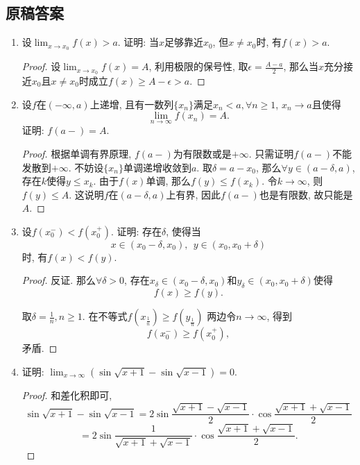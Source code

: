 \documentclass[UTF8,11pt, a4paper, oneside, fontset=none]{ctexbook}
\begin{document}
\clearpage

\subsection*{原稿答案}

\begin{enumerate}
\item 设$\lim_{x \to x_0}f(x) > a $. 证明: 当$x$足够靠近$x_0$, 但$x \neq x_0$时, 有$f(x) >a$.

\begin{proof}
设$\lim_{x \to x_0}f(x) = A$, 利用极限的保号性, 取$\epsilon = \frac{A - a}{2}$, 那么当$x$充分接近$x_0$且$x \neq x_0$时成立$f(x) \geq A- \epsilon > a$.

\end{proof}

\item 设$f$在$(-\infty, a)$上递增, 且有一数列$\{x_n\}$满足$x_n < a, \forall n \geq 1$, $x _n \to a$且使得
\[
\lim_{n \to \infty}f(x_n) =A.
\]
证明: $f(a-)=A$.

\begin{proof}
根据单调有界原理, $f(a-)$为有限数或是$+\infty$. 只需证明$f(a-)$不能发散到$+\infty$. 不妨设$\{x_n\}$单调递增收敛到$a$. 取$\delta = a-x_0$, 那么$\forall y \in (a-\delta, a)$, 存在$k$使得$y \leq x_k$. 由于$f(x)$单调, 那么$f(y) \leq f(x_k)$. 令$k \to \infty$, 则$f(y) \leq A$. 这说明$f$在$(a-\delta, a)$上有界, 因此$f(a-)$也是有限数, 故只能是$A$.

\end{proof}


\item 设$f(x_0^-) < f(x_0^+)$. 证明: 存在$\delta$, 使得当
\[
x \in (x_0 - \delta, x_0), \ \ y \in (x_0, x_0 + \delta)
\]
时, 有$f(x) < f(y)$.


\begin{proof}

反证. 那么$\forall \delta>0$, 存在$x_{\delta} \in (x_0 - \delta, x_0)$和$y_{\delta} \in (x_0, x_0 + \delta)$使得
\[
f(x) \geq f(y).
\]

取$\delta = \frac{1}{n}, n \geq 1$. 在不等式$f(x_{\frac{1}{n}}) \geq f(y_{\frac{1}{n}})$ 两边令$n \to \infty$, 得到
\[
f(x_0^-) \geq f(x_0^+),
\]
矛盾.

\end{proof}


\item 证明: $\lim_{x \to \infty}(\sin \sqrt{x+1} - \sin \sqrt{x-1}) =0$.

\begin{proof}
和差化积即可,
\[
\sin \sqrt{x+1} - \sin \sqrt{x-1} = 2 \sin \frac{\sqrt{x+1} - \sqrt{x-1}}{2} \cdot \cos  \frac{\sqrt{x+1} + \sqrt{x-1}}{2}
\]
\[
= 2 \sin \frac{1}{\sqrt{x+1} + \sqrt{x-1}} \cdot \cos  \frac{\sqrt{x+1} + \sqrt{x-1}}{2}.
\]


\end{proof}
\end{enumerate}
\end{document}
